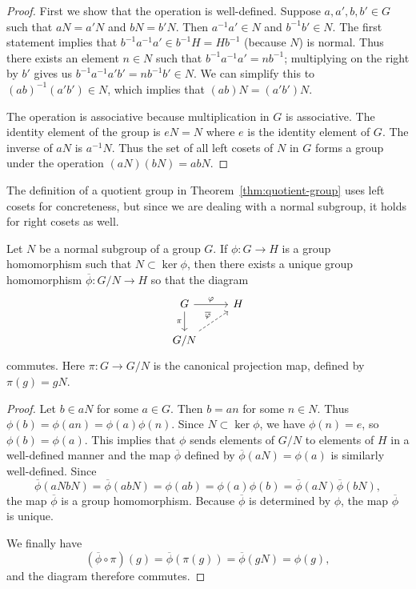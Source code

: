 \begin{proof}
    First we show that the operation is well-defined. Suppose \(a, a', b, b' \in
    G\) such that \(aN = a'N\) and \(bN = b'N\). Then \(a^{-1}a' \in N\) and
    \(b^{-1}b' \in N\). The first statement implies that \(b^{-1}a^{-1}a' \in
    b^{-1}H = Hb^{-1}\) (because \(N\)) is normal. Thus there exists an element
    \(n \in N\) such that \(b^{-1}a^{-1}a' = nb^{-1}\); multiplying on the right
    by \(b'\) gives us \(b^{-1}a^{-1}a'b' = nb^{-1}b' \in N\). We can simplify
    this to \((ab)^{-1}(a'b') \in N\), which implies that \((ab)N = (a'b')N\).

    The operation is associative because multiplication in \(G\) is associative.
    The identity element of the group is \(eN = N\) where \(e\) is the identity
    element of \(G\). The inverse of \(aN\) is \(a^{-1}N\). Thus the set of all
    left cosets of \(N\) in \(G\) forms a group under the operation \((aN)(bN) =
    abN\).
\end{proof}

\begin{remark}
    The definition of a quotient group in Theorem~\ref{thm:quotient-group} uses
    left cosets for concreteness, but since we are dealing with a normal
    subgroup, it holds for right cosets as well.
\end{remark}

\begin{theorem}
    \label{thm:induced-homomorphism}
    Let \(N\) be a normal subgroup of a group \(G\). If \(\phi: G \to H\) is a
    group homomorphism such that \(N \subset \ker \phi\), then there exists a
    unique group homomorphism \(\overline{\phi}: G/N \to H\) so that the diagram
    \[
        \begin{tikzcd}
            G \arrow{r}{\phi} \arrow[swap]{d}{\pi} & H \\
            G/N \arrow[dashed]{ur}{\overline{\phi}}
        \end{tikzcd}
    \]
    commutes. Here \(\pi: G \to G/N\) is the canonical projection map, defined
    by \(\pi(g) = gN\).
\end{theorem}

\begin{proof}
    Let \(b \in aN\) for some \(a \in G\). Then \(b = an\) for some \(n \in N\).
    Thus \(\phi(b) = \phi(an) = \phi(a)\phi(n)\). Since \(N \subset \ker \phi\),
    we have \(\phi(n) = e\), so \(\phi(b) = \phi(a)\). This implies that
    \(\phi\) sends elements of \(G/N\) to elements of \(H\) in a well-defined
    manner and the map \(\overline{\phi}\) defined by \(\overline{\phi}(aN) =
    \phi(a)\) is similarly well-defined. Since
    \[
    \overline{\phi}(aNbN) = \overline{\phi}(abN) = \phi(ab) = \phi(a)\phi(b) = \overline{\phi}(aN)\overline{\phi}(bN),
    \]
    the map \(\overline{\phi}\) is a group homomorphism. Because
    \(\overline{\phi}\) is determined by \(\phi\), the map \(\overline{\phi}\)
    is unique.

    We finally have
    \[
        (\overline{\phi} \circ \pi)(g) = \overline{\phi}(\pi(g)) = \overline{\phi}(gN) = \phi(g),
    \]
    and the diagram therefore commutes.
\end{proof}

